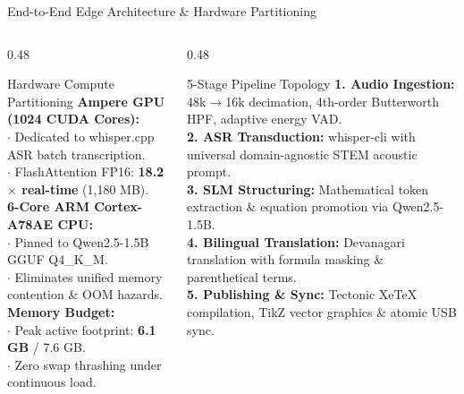 \documentclass[aspectratio=169,10pt]{beamer}
\begin{document}
\begin{frame}{End-to-End Edge Architecture \& Hardware Partitioning}
  \begin{columns}[T]
    \begin{column}{0.48\textwidth}
      \begin{block}{Hardware Compute Partitioning}
        \footnotesize
        \textbf{Ampere GPU (1024 CUDA Cores):}\\
        $\cdot$ Dedicated to whisper.cpp ASR batch transcription.\\
        $\cdot$ FlashAttention FP16: \textbf{18.2$\times$ real-time} (1,180 MB).\\
        \vspace{0.4em}
        \textbf{6-Core ARM Cortex-A78AE CPU:}\\
        $\cdot$ Pinned to Qwen2.5-1.5B GGUF Q4\_K\_M.\\
        $\cdot$ Eliminates unified memory contention \& OOM hazards.\\
        \vspace{0.4em}
        \textbf{Memory Budget:}\\
        $\cdot$ Peak active footprint: \textbf{6.1 GB} / 7.6 GB.\\
        $\cdot$ Zero swap thrashing under continuous load.
      \end{block}
    \end{column}
    \begin{column}{0.48\textwidth}
      \begin{block}{5-Stage Pipeline Topology}
        \footnotesize
        \textbf{1. Audio Ingestion:} 48k$\to$16k decimation, 4th-order Butterworth HPF, adaptive energy VAD.\\
        \textbf{2. ASR Transduction:} whisper-cli with universal domain-agnostic STEM acoustic prompt.\\
        \textbf{3. SLM Structuring:} Mathematical token extraction \& equation promotion via Qwen2.5-1.5B.\\
        \textbf{4. Bilingual Translation:} Devanagari translation with formula masking \& parenthetical terms.\\
        \textbf{5. Publishing \& Sync:} Tectonic XeTeX compilation, TikZ vector graphics \& atomic USB sync.
      \end{block}
    \end{column}
  \end{columns}
\end{frame}
\end{document}
